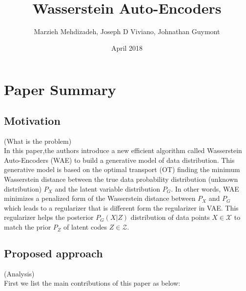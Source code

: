 \documentclass[12pt,english]{amsart}
\title{Wasserstein Auto-Encoders}
\author{Marzieh Mehdizadeh, Joseph D Viviano, Johnathan Guymont}
\date{April 2018}
\theoremstyle{definition}
\begin{document}
\maketitle

\section{Paper Summary}
\subsection{Motivation}
(What is the problem)\\
In this paper,the authors introduce a new efficient algorithm called Wasserstein
Auto-Encoders (WAE) to build a generative model of data distribution. This
generative model is based on the optimal transport (OT) finding the minimum
Wasserstein distance between the true data probability distribution (unknown
distribution) $P_X$ and the latent variable distribution $P_G$. In other words,
WAE minimizes a penalized form of the Wasserstein distance between $P_X$ and
$P_G$ which leads to a regularizer that is different form the regularizer in
VAE. This regularizer helps the posterior $P_G(X|Z)$ distribution of data points
$X\in \mathcal{X}$ to match the prior $P_Z$ of latent codes $Z \in \mathcal{Z}$.

\subsection{Proposed approach}

(Analysis)\\

First we list the main contributions of this paper as below:
\end{document}
